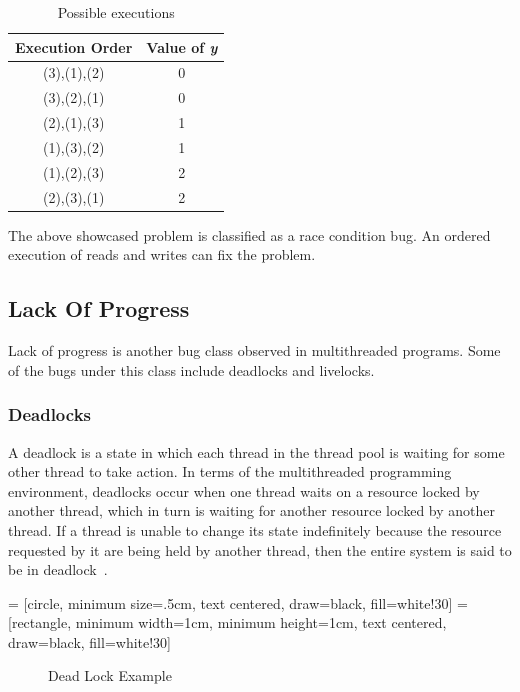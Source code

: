 \begin{table}[h]
\centering
\begin{tabular}{*{2}{c}}
Execution Order & Value of \emph{y} \\
\hline
 (3),(1),(2)& 0\\
 (3),(2),(1)& 0\\
 (2),(1),(3)& 1\\
 (1),(3),(2)& 1\\
 (1),(2),(3)& 2\\
 (2),(3),(1)& 2\\
\end{tabular}
\caption{Possible executions}
\label{poss_exec}
\end{table}

The above showcased problem is classified as a race condition bug. 
An ordered execution of reads and writes can fix the problem. 

\subsection{Lack Of Progress}

Lack of progress is another bug class observed in multithreaded programs. 
Some of the bugs under this class include deadlocks and livelocks. 

\subsubsection{Deadlocks}

A deadlock is a state in which each thread in the thread pool is waiting for some other thread to take action. 
In terms of the multithreaded programming environment, deadlocks occur when one thread waits on a resource locked by another thread, which in turn is waiting for another resource locked by another thread. 
If a thread is unable to change its state indefinitely because the resource requested by it are being held by another thread, then the entire system is said to be in deadlock~\citep{chaki2005concurrent}. 

 = [circle, minimum size=.5cm, text centered, draw=black, fill=white!30]
 = [rectangle, minimum width=1cm, minimum height=1cm, text centered, draw=black, fill=white!30]

\begin{figure}[h]
\centering
{}
\caption{Dead Lock Example}
\label{deadlock_example}
\end{figure}

